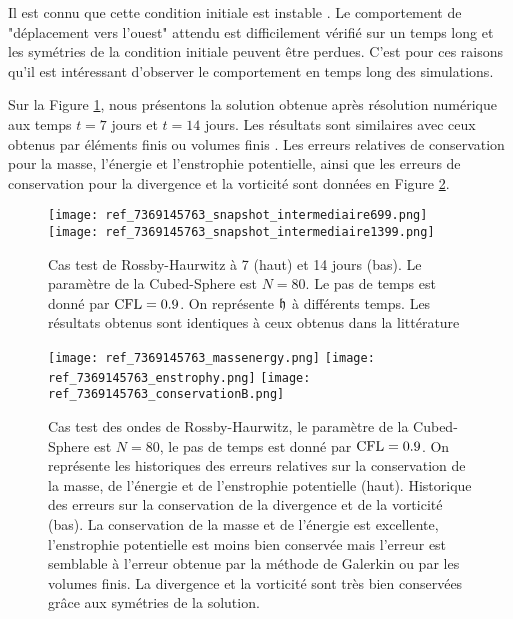 Il est connu  que cette condition initiale est instable \cite{Thuburn2000}. Le comportement de "déplacement vers l'ouest" attendu est difficilement vérifié sur un temps long et les symétries de la condition initiale peuvent être perdues. C'est pour ces raisons qu'il est intéressant d'observer le comportement en temps long des simulations.

Sur la Figure \ref{fig: rossby 714}, nous présentons la solution obtenue après résolution numérique aux temps $t=7$ jours et $t=14$ jours. Les résultats sont similaires avec ceux obtenus par éléments finis ou volumes finis \cite{Chen2008, Galewsky2004}. Les erreurs relatives de conservation pour la masse, l'énergie et l'enstrophie potentielle, ainsi que les erreurs de conservation pour la divergence et la vorticité sont données en Figure \ref{fig: rossby conservation}.

\begin{figure}[htbp]
\begin{center}
\texttt{[image: ref\_7369145763\_snapshot\_intermediaire699.png]}
\texttt{[image: ref\_7369145763\_snapshot\_intermediaire1399.png]}
\end{center}
\caption{Cas test de Rossby-Haurwitz à 7 (haut) et 14 jours (bas). Le paramètre de la Cubed-Sphere est $N=80$. Le pas de temps est donné par $\text{CFL}=0.9$. On représente $\mathfrak{h}$ à différents temps. Les résultats obtenus sont identiques à ceux obtenus dans la littérature \cite{Chen2008, Ullrich2011}}
\label{fig: rossby 714}
\end{figure}

\begin{figure}[htbp]
\begin{center}
\texttt{[image: ref\_7369145763\_massenergy.png]}
\texttt{[image: ref\_7369145763\_enstrophy.png]}
\texttt{[image: ref\_7369145763\_conservationB.png]}
\end{center}
\caption{Cas test des ondes de Rossby-Haurwitz, le paramètre de la Cubed-Sphere est $N=80$, le pas de temps est donné par $\text{CFL}=0.9$. On représente les historiques des erreurs relatives sur la conservation de la masse, de l'énergie et de l'enstrophie potentielle (haut). Historique des erreurs sur la conservation de la divergence et de la vorticité (bas). La conservation de la masse et de l'énergie est excellente, l'enstrophie potentielle est moins bien conservée mais l'erreur est semblable à l'erreur obtenue par la méthode de Galerkin ou par les volumes finis. La divergence et la vorticité sont très bien conservées grâce aux symétries de la solution.}
\label{fig: rossby conservation}
\end{figure}


